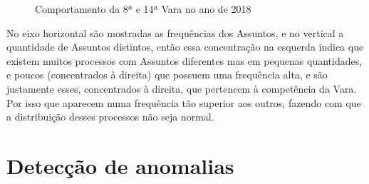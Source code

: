 \begin{figure}[h]
	\centering
	\qquad
	\caption{Comportamento da 8ª e 14ª Vara no ano de 2018}%
\end{figure}
\pagebreak
No eixo horizontal são mostradas as frequências dos Assuntos, e no vertical a quantidade de Assuntos distintos, então essa concentração na esquerda indica que existem muitos processos com Assuntos diferentes mas em pequenas quantidades, e poucos (concentrados à direita) que possuem uma frequência alta, e são justamente esses, concentrados à direita, que pertencem à competência da Vara. Por isso que aparecem numa frequência tão superior aos outros, fazendo com que a distribuição desses processos não seja normal.

\section{Detecção de anomalias}

